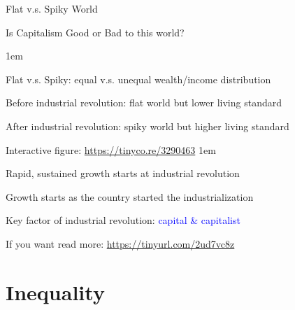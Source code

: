 \documentclass[11pt,aspectratio=43,usenames,dvipsnames]{beamer}
\newcommand{\blue}[1]{\textcolor{blue}{#1}}
\let\olditemize=\itemize
\let\endolditemize=\enditemize
\renewenvironment{itemize}{\olditemize \itemsep1em}{\endolditemize}
\theoremstyle{definition}
\begin{document}
\begin{frame}{Flat v.s. Spiky World}
\label{slide:Flat_v_s__Spiky_World}
    \begin{center}
        Is Capitalism Good or Bad to this world?
    \end{center}

    \begin{itemize}
        \item Flat v.s. Spiky: equal v.s. unequal wealth/income distribution
        \item Before industrial revolution: flat world but lower living standard
        \item After industrial revolution: spiky world but higher living standard
        \item Interactive figure: \blue{\url{https://tinyco.re/3290463}}
        \begin{itemize}
            \item Rapid, sustained growth starts at industrial revolution
            \item Growth starts as the country started the industrialization
        \end{itemize}
        \item Key factor of industrial revolution: \blue{capital \& capitalist}
        \item If you want read more: \blue{\url{https://tinyurl.com/2ud7vc8z}}
    \end{itemize}

\end{frame}

\section{Inequality}
\label{sec:Inequality}
\end{document}
